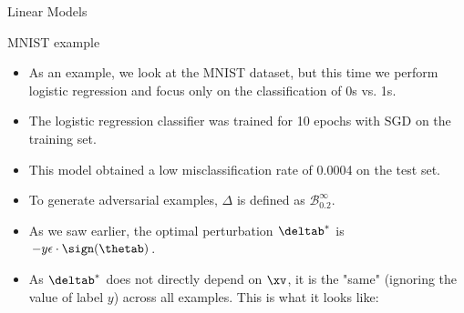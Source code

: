 \begin{vbframe} {Linear Models}
\end{vbframe}

\begin{vbframe} {MNIST example}

  \begin{itemize}
    \item As an example, we look at the MNIST dataset, but this time we perform logistic regression and focus only on the classification of 0s vs.    1s.
    \lz
    \item The logistic regression classifier was trained for 10 epochs with SGD on the training set. 
    \lz
    \item This model obtained a low misclassification rate of 0.0004 on the test set.  
    \lz
    \item To generate adversarial examples, $\Delta$ is defined as $\mathcal{B}^{\infty}_{0.2}$.
    \lz
    \item As we saw earlier, the optimal perturbation $\deltab^*$ is $-y\epsilon \cdot \sign(\thetab)$.
  \framebreak
  \item As $\deltab^*$ does not directly depend on $\xv$, it is the "same" (ignoring the value of label $y$) across all examples. This is what it looks like:
    \begin{figure}
    \captionsetup{font=footnotesize,labelfont=footnotesize, labelfont = bf}
    \centering

\end{figure}
\end{itemize}
\end{vbframe}
